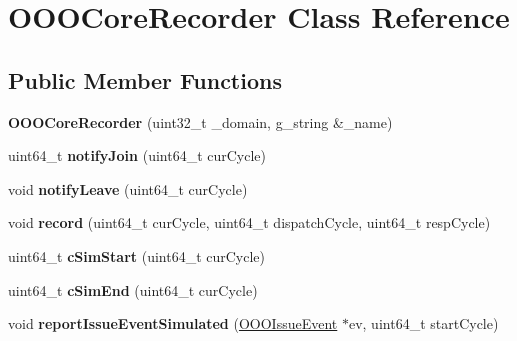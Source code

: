 \hypertarget{classOOOCoreRecorder}{\section{O\-O\-O\-Core\-Recorder Class Reference}
\label{classOOOCoreRecorder}
}
\subsection*{Public Member Functions}
\begin{DoxyCompactItemize}
\item 
\hypertarget{classOOOCoreRecorder_ad71f84f2693ed25658e5efcddf7e9341}{{\bfseries O\-O\-O\-Core\-Recorder} (uint32\-\_\-t \-\_\-domain, g\-\_\-string \&\-\_\-name)}\label{classOOOCoreRecorder_ad71f84f2693ed25658e5efcddf7e9341}

\item 
\hypertarget{classOOOCoreRecorder_a8038641e35855286f897a582c78e4f13}{uint64\-\_\-t {\bfseries notify\-Join} (uint64\-\_\-t cur\-Cycle)}\label{classOOOCoreRecorder_a8038641e35855286f897a582c78e4f13}

\item 
\hypertarget{classOOOCoreRecorder_a159c5560af33055f0004e9e6cb354c13}{void {\bfseries notify\-Leave} (uint64\-\_\-t cur\-Cycle)}\label{classOOOCoreRecorder_a159c5560af33055f0004e9e6cb354c13}

\item 
\hypertarget{classOOOCoreRecorder_ac2444a695ce658d7d09f0a4127f0734f}{void {\bfseries record} (uint64\-\_\-t cur\-Cycle, uint64\-\_\-t dispatch\-Cycle, uint64\-\_\-t resp\-Cycle)}\label{classOOOCoreRecorder_ac2444a695ce658d7d09f0a4127f0734f}

\item 
\hypertarget{classOOOCoreRecorder_aa41b17a7eb54f923bd40ee97a4017578}{uint64\-\_\-t {\bfseries c\-Sim\-Start} (uint64\-\_\-t cur\-Cycle)}\label{classOOOCoreRecorder_aa41b17a7eb54f923bd40ee97a4017578}

\item 
\hypertarget{classOOOCoreRecorder_a156522803029ba35178bc25dc0549b9b}{uint64\-\_\-t {\bfseries c\-Sim\-End} (uint64\-\_\-t cur\-Cycle)}\label{classOOOCoreRecorder_a156522803029ba35178bc25dc0549b9b}

\item 
\hypertarget{classOOOCoreRecorder_abdc5c2a36c87aa1502d40fd3f1ad853c}{void {\bfseries report\-Issue\-Event\-Simulated} (\hyperlink{classOOOIssueEvent}{O\-O\-O\-Issue\-Event} $\ast$ev, uint64\-\_\-t start\-Cycle)}\label{classOOOCoreRecorder_abdc5c2a36c87aa1502d40fd3f1ad853c}


\end{DoxyCompactItemize}

